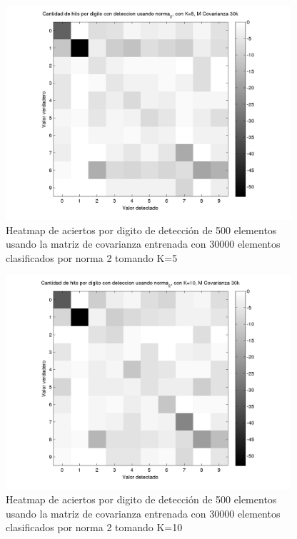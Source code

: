 \begin{figure}[H]
\includegraphics[width=300pt]{plots/heatmap-30kcv-k5-norma_2.png}
\caption{Heatmap de aciertos por digito de detecci\'on de 500 elementos usando la matriz de covarianza entrenada con 30000 elementos
clasificados por norma 2 tomando K=5}
\label{fig:HM30kcv-k5}
\end{figure}

\begin{figure}[H]
\includegraphics[width=300pt]{plots/heatmap-30kcv-k10-norma_2.png}
\caption{Heatmap de aciertos por digito de detecci\'on de 500 elementos usando la matriz de covarianza entrenada con 30000 elementos
clasificados por norma 2 tomando K=10 }
\label{fig:HM30kcv-k10}
\end{figure}


